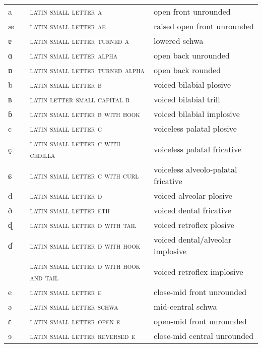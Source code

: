 \begin{center}
\begin{xtabular}{ l l L{4.5cm} L{4.5cm} }
a &  & \textsc{latin small letter a} & open front unrounded \\ 
æ &  & \textsc{latin small letter ae} & raised open front unrounded \\ 
ɐ &  & \textsc{latin small letter turned a} & lowered schwa \\ 
ɑ &  & \textsc{latin small letter alpha} & open back unrounded \\ 
ɒ &  & \textsc{latin small letter turned alpha} & open back rounded \\ 
b &  & \textsc{latin small letter b} & voiced bilabial plosive \\ 
ʙ &  & \textsc{latin letter small capital b} & voiced bilabial trill \\ 
ɓ &  & \textsc{latin small letter b with hook} & voiced bilabial implosive \\ 
c &  & \textsc{latin small letter c} & voiceless palatal plosive \\ 
ç &  & \textsc{latin small letter c with cedilla} & voiceless palatal fricative \\ 
ɕ &  & \textsc{latin small letter c with curl} & voiceless alveolo-palatal fricative \\ 
d &  & \textsc{latin small letter d} & voiced alveolar plosive \\ 
ð &  & \textsc{latin small letter eth} & voiced dental fricative \\ 
ɖ &  & \textsc{latin small letter d with tail} & voiced retroflex plosive \\ 
ɗ &  & \textsc{latin small letter d with hook} & voiced dental/alveolar implosive \\ 
 &  & \textsc{latin small letter d with hook and tail} & voiced retroflex implosive \\ 
e &  & \textsc{latin small letter e} & close-mid front unrounded \\ 
ə &  & \textsc{latin small letter schwa} & mid-central schwa \\ 
ɛ &  & \textsc{latin small letter open e} & open-mid front unrounded \\ 
ɘ &  & \textsc{latin small letter reversed e} & close-mid central unrounded \\ 

\end{xtabular}
\end{center}
